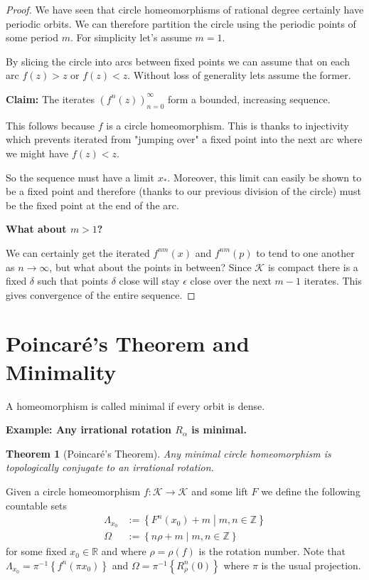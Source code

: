 \documentclass[11pt]{article}
\newcommand{\defeq}{:=}
\newcommand{\relmiddle}[1]{\mathrel{}\middle#1\mathrel{}}
\newcommand{\rmv}{\relmiddle|}
\newcommand{\R}{\mathbb{R}}
\newcommand{\Z}{\mathbb{Z}}
\newenvironment{defin}
	{\begin{mdframed}[backgroundcolor=white, roundcorner=5pt, linewidth=1pt, linecolor=Green]
		\setlength{\parindent}{0pt}}
	{\end{mdframed}}
\newcommand{\mdf}[1]{{\color{Green} #1}}
\newenvironment{eg}
	{\begin{mdframed}[backgroundcolor=mylg,roundcorner=5pt,linewidth=0pt]\bfseries{Example:}\normalfont
	\setlength{\parindent}{0pt}}
	{\end{mdframed}}
\newtheorem{theorem}{Theorem}[section]
\begin{document}
\begin{proof}
We have seen that circle homeomorphisms of rational degree certainly have periodic orbits.
We can therefore partition the circle using the periodic points of some period $m$.
For simplicity let's assume $m=1$.

By slicing the circle into arcs between fixed points we can assume that on each arc $f(z)>z$ or $f(z)<z$.
Without loss of generality lets assume the former.

\textbf{Claim: }The iterates $(f^n(z))_{n=0}^\infty$ form a bounded, increasing sequence.

This follows because $f$ is a circle homeomorphism.
This is thanks to injectivity which prevents iterated from "jumping over" a fixed point into the next arc where we might have $f(z) < z$.

So the sequence must have a limit $x_\ast$.
Moreover, this limit can easily be shown to be a fixed point and therefore (thanks to our previous division of the circle) must be the fixed point at the end of the arc.

\textbf{What about $m> 1$?}

We can certainly get the iterated $f^{nm}(x)$ and $f^{nm}(p)$ to tend to one another as $n\to\infty$, but what about the points in between?
Since $\mathcal{K}$ is compact there is a fixed $\delta$ such that points $\delta$ close will stay $\epsilon$ close over the next $m-1$ iterates.
This gives convergence of the entire sequence.
\end{proof}

\section{Poincar\'e's Theorem and Minimality}

\begin{defin}
	A homeomorphism is called \mdf{minimal} if every orbit is dense.	
\end{defin}

\begin{eg}
Any irrational rotation $R_\alpha$ is minimal.
\end{eg}

\begin{theorem}[Poincar\'e's Theorem]
Any minimal circle homeomorphism is topologically conjugate to an irrational rotation.
\end{theorem}

Given a circle homeomorphism $f:\mathcal{K}\to\mathcal{K}$ and some lift $F$ we define the following countable sets
\begin{align*}
	\Lambda_{x_0}&\defeq\left\{F^n(x_0)+m \rmv m, n\in \Z\right\}\\
	\Omega &\defeq \left\{n \rho +m \rmv m, n \in \Z\right\}
\end{align*}
for some fixed $x_0\in\R$ and where $\rho = \rho(f)$ is the rotation number.
Note that $\Lambda_{x_0}=\pi^{-1}\left\{f^n(\pi x_0)\right\}$ and $\Omega=\pi^{-1}\left\{R_\rho ^n (0)\right\}$ where $\pi$ is the usual projection.
\end{document}
